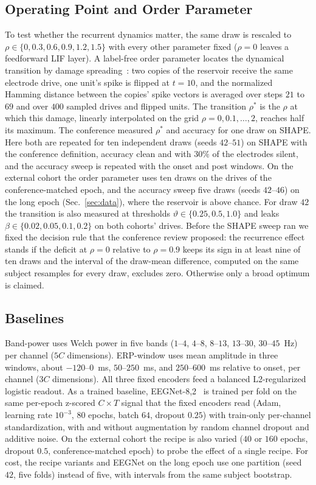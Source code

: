 \documentclass[journal]{IEEEtran}
\begin{document}
\subsection{Operating Point and Order Parameter}
To test whether the recurrent dynamics matter, the same draw is rescaled to $\rho\in\{0,0.3,0.6,0.9,1.2,1.5\}$ with every other parameter fixed ($\rho=0$ leaves a feedforward LIF layer). A label-free order parameter locates the dynamical transition by damage spreading~\cite{bertschinger2004realtime}: two copies of the reservoir receive the same electrode drive, one unit's spike is flipped at $t=10$, and the normalized Hamming distance between the copies' spike vectors is averaged over steps $21$ to $69$ and over $400$ sampled drives and flipped units. The transition $\rho^\ast$ is the $\rho$ at which this damage, linearly interpolated on the grid $\rho=0,0.1,\dots,2$, reaches half its maximum. The conference measured $\rho^\ast$ and accuracy for one draw on SHAPE. Here both are repeated for ten independent draws (seeds $42$--$51$) on SHAPE with the conference definition, accuracy clean and with $30\%$ of the electrodes silent, and the accuracy sweep is repeated with the onset and post windows. On the external cohort the order parameter uses ten draws on the drives of the conference-matched epoch, and the accuracy sweep five draws (seeds $42$--$46$) on the long epoch (Sec.~\ref{sec:data}), where the reservoir is above chance. For draw $42$ the transition is also measured at thresholds $\vartheta\in\{0.25,0.5,1.0\}$ and leaks $\beta\in\{0.02,0.05,0.1,0.2\}$ on both cohorts' drives. Before the SHAPE sweep ran we fixed the decision rule that the conference review proposed: the recurrence effect stands if the deficit at $\rho=0$ relative to $\rho=0.9$ keeps its sign in at least nine of ten draws and the interval of the draw-mean difference, computed on the same subject resamples for every draw, excludes zero. Otherwise only a broad optimum is claimed.

\subsection{Baselines}
Band-power uses Welch power in five bands ($1$--$4$, $4$--$8$, $8$--$13$, $13$--$30$, $30$--$45$~Hz) per channel ($5C$ dimensions). ERP-window uses mean amplitude in three windows, about $-120$--$0$~ms, $50$--$250$~ms, and $250$--$600$~ms relative to onset, per channel ($3C$ dimensions). All three fixed encoders feed a balanced L2-regularized logistic readout. As a trained baseline, EEGNet-8,2~\cite{lawhern2018eegnet} is trained per fold on the same per-epoch z-scored $C\times T$ signal that the fixed encoders read (Adam, learning rate $10^{-3}$, $80$ epochs, batch $64$, dropout $0.25$) with train-only per-channel standardization, with and without augmentation by random channel dropout and additive noise. On the external cohort the recipe is also varied ($40$ or $160$ epochs, dropout $0.5$, conference-matched epoch) to probe the effect of a single recipe. For cost, the recipe variants and EEGNet on the long epoch use one partition (seed $42$, five folds) instead of five, with intervals from the same subject bootstrap.
\end{document}
